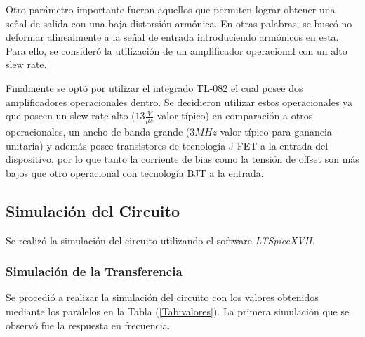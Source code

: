 Otro parámetro importante fueron aquellos que permiten lograr obtener una señal de salida con una baja distorsión armónica. En otras palabras, se buscó no deformar alinealmente a la señal de entrada introduciendo armónicos en esta. Para ello, se consideró la utilización de un amplificador operacional con un alto slew rate.

Finalmente se optó por utilizar el integrado TL-082 el cual posee dos amplificadores operacionales dentro. Se decidieron utilizar estos operacionales ya que poseen un slew rate alto ($13\frac{V}{\mu s}$ valor típico) en comparación a otros operacionales, un ancho de banda grande ($3MHz$ valor típico para ganancia unitaria) y además posee transistores de tecnología J-FET a la entrada del dispositivo, por lo que tanto la corriente de bias como la tensión de offset son más bajos que otro operacional con tecnología BJT a la entrada.

\subsection{Simulación del Circuito}
\label{sec:simulacion}

Se realizó la simulación del circuito utilizando el software \textit{LTSpiceXVII}.

\subsubsection{Simulación de la Transferencia}

Se procedió a realizar la simulación del circuito con los valores obtenidos mediante los paralelos en la Tabla (\ref{Tab:valores}). La primera simulación que se observó fue la respuesta en frecuencia.

